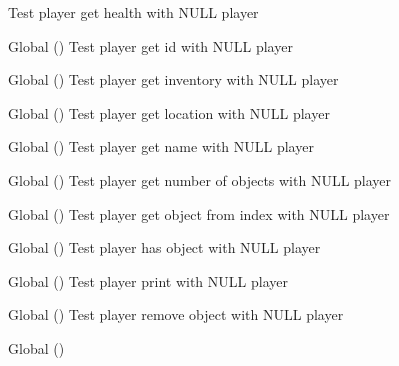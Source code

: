 \begin{DoxyRefList}
Test player get health with NULL player  
\item[Global \doxylink{player__test_8c_a9fa80f0c0e46b45eb9f1685b102a5826}{test2\+\_\+player\+\_\+get\+\_\+id} ()]\label{test__test000117}%
%
Test player get id with NULL player  
\item[Global \doxylink{player__test_8c_a8f3a62c708fbed848568841ca8b1cd26}{test2\+\_\+player\+\_\+get\+\_\+inventory} ()]\label{test__test000135}%
%
Test player get inventory with NULL player  
\item[Global \doxylink{player__test_8c_a4c5605fac4bd716e1dfb2744db4fa8a1}{test2\+\_\+player\+\_\+get\+\_\+location} ()]\label{test__test000139}%
%
Test player get location with NULL player  
\item[Global \doxylink{player__test_8c_a3aa908fd360b74e7786422260e8e16a0}{test2\+\_\+player\+\_\+get\+\_\+name} ()]\label{test__test000121}%
%
Test player get name with NULL player  
\item[Global \doxylink{player__test_8c_af795956906ac0779f168e882288257c8}{test2\+\_\+player\+\_\+get\+\_\+num\+\_\+objects} ()]\label{test__test000145}%
%
Test player get number of objects with NULL player  
\item[Global \doxylink{player__test_8c_aae715732b4bd9e99580340c109518d7e}{test2\+\_\+player\+\_\+get\+\_\+object\+\_\+from\+\_\+index} ()]\label{test__test000143}%
%
Test player get object from index with NULL player  
\item[Global \doxylink{player__test_8c_ae8953d45d8f555a930dbc8aba101d399}{test2\+\_\+player\+\_\+has\+\_\+object} ()]\label{test__test000149}%
%
Test player has object with NULL player  
\item[Global \doxylink{player__test_8c_a46b5c792a37831e8c142d4c32b9767f7}{test2\+\_\+player\+\_\+print} ()]\label{test__test000137}%
%
Test player print with NULL player  
\item[Global \doxylink{player__test_8c_af9e74e12ad6961761f1ff61afa56be3e}{test2\+\_\+player\+\_\+remove\+\_\+object} ()]\label{test__test000147}%
%
Test player remove object with NULL player  
\item[Global \doxylink{player__test_8c_a1e47a0571a050194ebe7f0cf6102033e}{test2\+\_\+player\+\_\+set\+\_\+description} ()]\label{test__test000133}%
%

\end{DoxyRefList}
